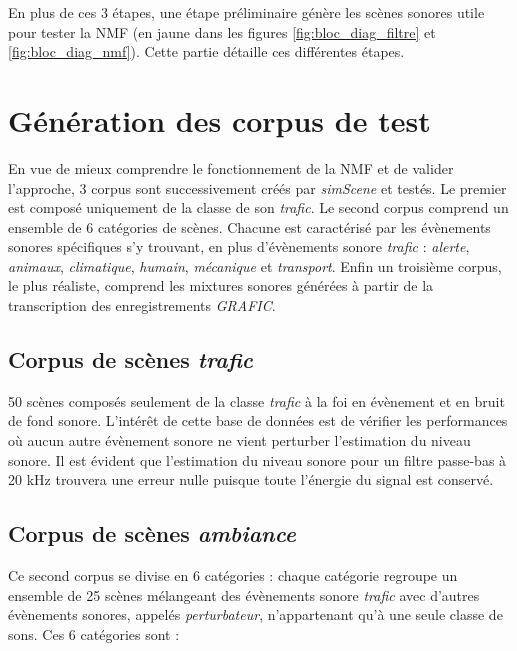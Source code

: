 En plus de ces 3 étapes, une étape préliminaire génère les scènes sonores utile pour tester la NMF (en jaune dans les figures \ref{fig:bloc_diag_filtre} et \ref{fig:bloc_diag_nmf}). Cette partie détaille ces différentes étapes. 

\section{Génération des corpus de test}
En vue de mieux comprendre le fonctionnement de la NMF et de valider l'approche, 3 corpus sont successivement créés par \textit{simScene} et testés. Le premier est composé uniquement de la classe de son \textit{trafic}. Le second corpus comprend un ensemble de 6 catégories de scènes. Chacune est caractérisé par les évènements sonores spécifiques s'y trouvant, en plus d'évènements sonore \textit{trafic} : \textit{alerte}, \textit{animaux}, \textit{climatique}, \textit{humain}, \textit{mécanique} et \textit{transport}. Enfin un troisième corpus, le plus réaliste, comprend les mixtures sonores générées à partir de la transcription des enregistrements \textit{GRAFIC}.

\subsection{Corpus de scènes \textit{trafic}}
50 scènes composés seulement de la classe \textit{trafic} à la foi en évènement et en bruit de fond sonore. L'intérêt de cette base de données est de vérifier les performances où aucun autre évènement sonore ne vient perturber l'estimation du niveau sonore. Il est évident que l'estimation du niveau sonore pour un filtre passe-bas à 20 kHz trouvera une erreur nulle puisque toute l'énergie du signal est conservé. 

\subsection{Corpus de scènes \textit{ambiance}}

Ce second corpus se divise en 6 catégories : chaque catégorie regroupe un ensemble de 25 scènes mélangeant des évènements sonore \textit{trafic} avec d'autres évènements sonores,  appelés \textit{perturbateur}, n'appartenant qu'à une seule classe de sons. Ces 6 catégories sont : 

